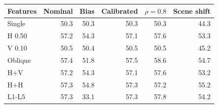 \begin{tabular}{lrrrrr}
\toprule
Features & Nominal & Bias & Calibrated & $\rho=0.8$ & Scene shift \\
\midrule
Single & 50.3 & 50.3 & 50.3 & 50.3 & 44.3 \\
H 0.50 & 57.2 & 54.3 & 57.1 & 57.6 & 53.3 \\
V 0.10 & 50.5 & 50.4 & 50.5 & 50.5 & 45.2 \\
Oblique & 57.4 & 51.8 & 57.5 & 58.6 & 54.7 \\
H$+$V & 57.2 & 54.3 & 57.1 & 57.6 & 53.2 \\
H$+$H & 57.3 & 54.8 & 57.3 & 57.2 & 55.2 \\
L1-L5 & 57.3 & 33.1 & 57.3 & 57.8 & 54.2 \\
\bottomrule
\end{tabular}